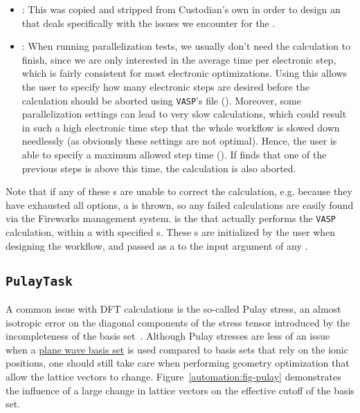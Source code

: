 \begin{refsection}
\begin{itemize}

\item {}: This  was copied and stripped from Custodian's own  in order to design an  that deals specifically with the issues we encounter for the .

\item {}: When running parallelization tests, we usually don't need the calculation to finish, since we are only interested in the average time per electronic step, which is fairly consistent for most electronic optimizations. Using this  allows the user to specify how many electronic steps are desired before the calculation should be aborted using \texttt{VASP}'s  file (). Moreover, some parallelization settings can lead to very slow calculations, which could result in such a high electronic time step that the whole workflow is slowed down needlessly (as obviously these settings are not optimal). Hence, the user is able to specify a maximum allowed step time (). If  finds that one of the previous steps is above this time, the calculation is also aborted.

\end{itemize}

Note that if any of these s are unable to correct the calculation, e.g. because they have exhausted all options, a  is thrown, so any failed calculations are easily found via the Fireworks management system.  is the  that actually performs the \texttt{VASP} calculation, within a  with specified s. These s are initialized by the user when designing the workflow, and passed as a  to the  input argument of any .

\subsection{\texttt{PulayTask}} \label{automation:sec-PulayTask}

A common issue with DFT calculations is the so-called Pulay stress, an almost isotropic error on the diagonal components of the stress tensor introduced by the incompleteness of the basis set~\cite{Francis1990}. Although Pulay stresses are less of an issue when a \hyperref[dft:sec-planewave]{plane wave basis set} is used compared to basis sets that rely on the ionic positions, one should still take care when performing geometry optimization that allow the lattice vectors to change. Figure~\ref{automation:fig-pulay} demonstrates the influence of a large change in lattice vectors on the effective cutoff of the basis set. 


\end{refsection}
